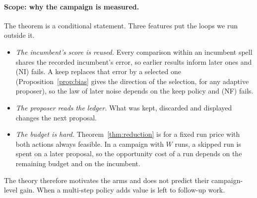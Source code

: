 \paragraph{Scope: why the campaign is measured.}
The theorem is a conditional statement. Three features put the loops we run outside it.
\begin{itemize}
\item \emph{The incumbent's score is reused.} Every comparison within an incumbent spell shares the recorded incumbent's error, so earlier results inform later ones and (NI) fails. A keep replaces that error by a selected one (Proposition~\ref{prop:bias} gives the direction of the selection, for any adaptive proposer), so the law of later noise depends on the keep policy and (NF) fails.
\item \emph{The proposer reads the ledger.} What was kept, discarded and displayed changes the next proposal.
\item \emph{The budget is hard.} Theorem~\ref{thm:reduction} is for a fixed run price with both actions always feasible. In a campaign with $W$ runs, a skipped run is spent on a later proposal, so the opportunity cost of a run depends on the remaining budget and on the incumbent.
\end{itemize}
The theory therefore motivates the arms and does not predict their campaign-level gain. When a multi-step policy adds value is left to follow-up work.
